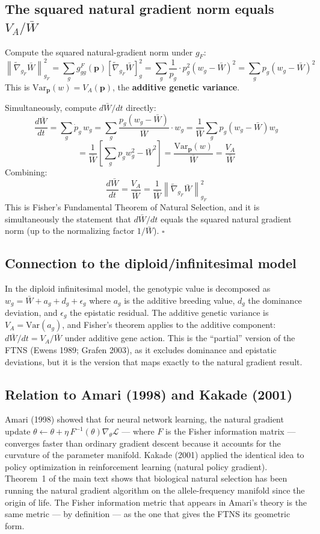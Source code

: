 \documentclass[12pt]{article}
\theoremstyle{remark}
\begin{document}
\subsection{The squared natural gradient norm equals $V_A/\bar{W}$}

Compute the squared natural-gradient norm under $g_F$:
\[
  \left\|\tilde{\nabla}_{g_F}\bar{W}\right\|^2_{g_F}
  = \sum_g g^F_{gg}(\mathbf{p})\left[\tilde{\nabla}_{g_F}\bar{W}\right]_g^2
  = \sum_g \frac{1}{p_g} \cdot p_g^2(w_g - \bar{W})^2
  = \sum_g p_g(w_g - \bar{W})^2
\]
This is $\mathrm{Var}_\mathbf{p}(w) = V_A(\mathbf{p})$, the \textbf{additive genetic variance}.

Simultaneously, compute $d\bar{W}/dt$ directly:
\[
  \frac{d\bar{W}}{dt} = \sum_g \dot{p}_g\, w_g
  = \sum_g \frac{p_g(w_g - \bar{W})}{\bar{W}} \cdot w_g
  = \frac{1}{\bar{W}}\sum_g p_g(w_g - \bar{W})w_g
\]
\[
  = \frac{1}{\bar{W}}\left[\sum_g p_g w_g^2 - \bar{W}^2\right]
  = \frac{\mathrm{Var}_\mathbf{p}(w)}{\bar{W}} = \frac{V_A}{\bar{W}}
\]
Combining:
\[
  \frac{d\bar{W}}{dt} = \frac{V_A}{\bar{W}} = \frac{1}{\bar{W}}\left\|\tilde{\nabla}_{g_F}\bar{W}\right\|^2_{g_F}
\]
This is Fisher's Fundamental Theorem of Natural Selection, and it is simultaneously the statement that $d\bar{W}/dt$ equals the squared natural gradient norm (up to the normalizing factor $1/\bar{W}$). $\square$

\subsection{Connection to the diploid/infinitesimal model}

In the diploid infinitesimal model, the genotypic value is decomposed as $w_g = \bar{W} + a_g + d_g + \epsilon_g$ where $a_g$ is the additive breeding value, $d_g$ the dominance deviation, and $\epsilon_g$ the epistatic residual. The additive genetic variance is $V_A = \mathrm{Var}(a_g)$, and Fisher's theorem applies to the additive component: $d\bar{W}/dt = V_A/\bar{W}$ under additive gene action. This is the ``partial'' version of the FTNS (Ewens 1989; Grafen 2003), as it excludes dominance and epistatic deviations, but it is the version that maps exactly to the natural gradient result.

\subsection{Relation to Amari (1998) and Kakade (2001)}

Amari (1998) showed that for neural network learning, the natural gradient update $\theta \leftarrow \theta + \eta\, F^{-1}(\theta)\nabla_\theta \mathcal{L}$ --- where $F$ is the Fisher information matrix --- converges faster than ordinary gradient descent because it accounts for the curvature of the parameter manifold. Kakade (2001) applied the identical idea to policy optimization in reinforcement learning (natural policy gradient). Theorem~1 of the main text shows that biological natural selection has been running the natural gradient algorithm on the allele-frequency manifold since the origin of life. The Fisher information metric that appears in Amari's theory is the same metric --- by definition --- as the one that gives the FTNS its geometric form.
\end{document}
